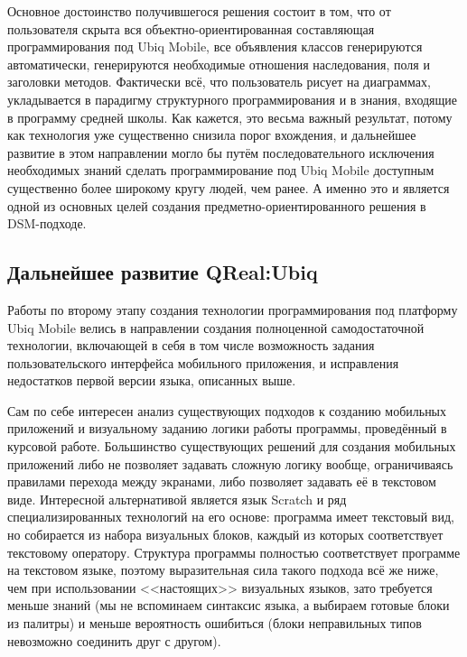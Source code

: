 Основное достоинство получившегося решения состоит в том, что от пользователя скрыта 
вся объектно-ориентированная составляющая программирования под Ubiq Mobile, все объявления 
классов генерируются автоматически, генерируются необходимые отношения наследования, 
поля и заголовки методов. Фактически всё, что пользователь рисует на диаграммах, укладывается 
в парадигму структурного программирования и в знания, входящие в программу средней 
школы. Как кажется, это весьма важный результат, потому как технология уже существенно 
снизила порог вхождения, и дальнейшее развитие в этом направлении могло бы путём последовательного 
исключения необходимых знаний сделать программирование под Ubiq Mobile доступным существенно 
более широкому кругу людей, чем ранее. А именно это и является одной из основных целей 
создания предметно-ориентированного решения в \ac{DSM}-подходе.

\subsection{Дальнейшее развитие QReal:Ubiq}
\label{chapter:advancedQRealUbiq}
Работы по второму этапу создания технологии программирования под платформу Ubiq Mobile 
велись в направлении создания полноценной самодостаточной технологии, включающей в себя 
в том числе возможность задания пользовательского интерфейса мобильного приложения, 
и исправления недостатков первой версии языка, описанных выше.

Сам по себе интересен анализ существующих подходов к созданию мобильных приложений 
и визуальному заданию логики работы программы, проведённый в курсовой работе. Большинство 
существующих решений для создания мобильных приложений либо не позволяет задавать 
сложную логику вообще, ограничиваясь правилами перехода между экранами, либо позволяет 
задавать её в текстовом виде. Интересной альтернативой является язык Scratch и ряд 
специализированных технологий на его основе: программа имеет текстовый вид, но собирается 
из набора визуальных блоков, каждый из которых соответствует текстовому оператору. 
Структура программы полностью соответствует программе на текстовом языке, поэтому 
выразительная сила такого подхода всё же ниже, чем при использовании <<настоящих>> 
визуальных языков, зато требуется меньше знаний (мы не вспоминаем синтаксис языка, 
а выбираем готовые блоки из палитры) и меньше вероятность ошибиться (блоки неправильных 
типов невозможно соединить друг с другом).

